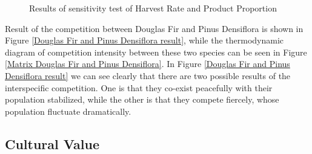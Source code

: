 \documentclass{mcmthesis}
\numberwithin{figure}{section}
\numberwithin{table}{section}
\numberwithin{equation}{section}
\begin{document}
\begin{figure}[htbp]
  \centering
\caption{Results of sensitivity test of Harvest Rate and Product Proportion}
\end{figure}

Result of the competition between Douglas Fir and Pinus Densiflora is shown in 
Figure \ref{Douglas Fir and Pinus Densiflora result}, while the thermodynamic diagram
of competition intensity between these two species can be seen in Figure \ref{Matrix Douglas Fir and Pinus Densiflora}.
In Figure \ref{Douglas Fir and Pinus Densiflora result} we can see clearly that 
there are two possible results of the interspecific competition. One is that they co-exist peacefully with their
population stabilized, while the other is that they compete fiercely, whose population fluctuate
dramatically.




\subsection{Cultural Value}
\end{document}
